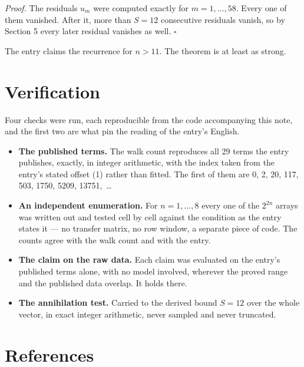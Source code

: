 \documentclass[11pt]{article}
\theoremstyle{definition}
\begin{document}
{\itshape Proof.} The residuals $u_m$ were computed exactly for $m = 1,\dots,58$. Every one of them vanished. After it, more than $S = 12$ consecutive residuals vanish, so by Section 5 every later residual vanishes as well. $\square$

The entry claims the recurrence for $n > 11$. The theorem is at least as strong.

\section{Verification}

Four checks were run, each reproducible from the code accompanying this note, and the first two are what pin the reading of the entry's English.

\begin{itemize}

\item {\bfseries The published terms.} The walk count reproduces all 29 terms the entry publishes, exactly, in integer arithmetic, with the index taken from the entry's stated offset (1) rather than fitted. The first of them are 0, 2, 20, 117, 503, 1750, 5209, 13751,~\dots

\item {\bfseries An independent enumeration.} For $n = 1,\dots,8$ every one of the $2^{2n}$ arrays was written out and tested cell by cell against the condition as the entry states it --- no transfer matrix, no row window, a separate piece of code. The counts agree with the walk count and with the entry.

\item {\bfseries The claim on the raw data.} Each claim was evaluated on the entry's published terms alone, with no model involved, wherever the proved range and the published data overlap. It holds there.

\item {\bfseries The annihilation test.} Carried to the derived bound $S = 12$ over the whole vector, in exact integer arithmetic, never sampled and never truncated.

\end{itemize}

\section{References}
\end{document}
